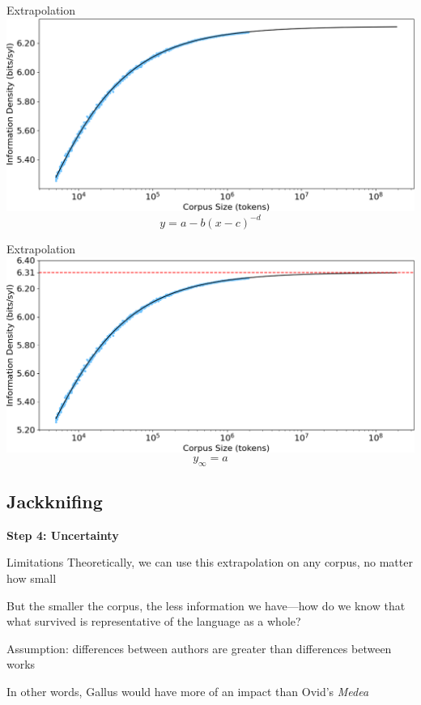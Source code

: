 \documentclass{beamer}
\begin{document}
\begin{frame}{Extrapolation}
\includegraphics[width=\linewidth]{demo2}
\vspace{-2ex}
\[y=a-b(x-c)^{-d}\]
\end{frame}

\begin{frame}{Extrapolation}
\includegraphics[width=\linewidth]{demo3}
\vspace{-2ex}
\[y_{\infty}=a\]
\end{frame}

\subsection{Jackknifing}

\begin{frame}{}
\begin{center}
\textbf{\Large Step 4: Uncertainty}
\end{center}
\end{frame}

\begin{frame}{Limitations}
Theoretically, we can use this extrapolation on any corpus, no matter how small

But the smaller the corpus, the less information we have---how do we know that what survived is representative of the language as a whole?

Assumption: differences between authors are greater than differences between works

In other words, Gallus would have more of an impact than Ovid's \emph{Medea}
\end{frame}
\end{document}
